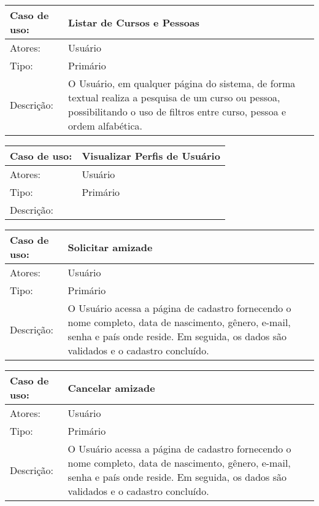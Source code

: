 \documentclass[12pt,a4paper,onecolumn,titlepage]{article}
\begin{document}
\newpage

\begin{table}[h!]
\begin{center}
\begin{tabular}{p{2.5cm} p{9.5cm}}
Caso de uso: & \textbf{Listar de Cursos e Pessoas} \\ \hline
Atores: & Usuário \\ \hline
Tipo: & Primário \\ \hline
Descrição: & O Usuário, em qualquer página do sistema, de forma textual realiza a pesquisa de um curso ou pessoa, possibilitando o uso de filtros entre curso, pessoa e ordem alfabética.

\end{tabular}
\end{center}
\end{table}

\newpage

\begin{table}[h!]
\begin{center}
\begin{tabular}{p{2.5cm} p{9.5cm}}
Caso de uso: & \textbf{Visualizar Perfis de Usuário} \\ \hline
Atores: & Usuário \\ \hline
Tipo: & Primário \\ \hline
Descrição: & 
\end{tabular}
\end{center}
\end{table}

\newpage

\begin{table}[h!]
\begin{center}
\begin{tabular}{p{2.5cm} p{9.5cm}}
Caso de uso: & \textbf{Solicitar amizade} \\ \hline
Atores: & Usuário \\ \hline
Tipo: & Primário \\ \hline
Descrição: & O Usuário acessa a página de cadastro fornecendo o nome completo, data de nascimento, gênero, e-mail, senha e país onde reside. Em seguida, os dados são validados e o cadastro concluído.
\end{tabular}
\end{center}
\end{table}

\newpage

\begin{table}[h!]
\begin{center}
\begin{tabular}{p{2.5cm} p{9.5cm}}
Caso de uso: & \textbf{Cancelar amizade} \\ \hline
Atores: & Usuário \\ \hline
Tipo: & Primário \\ \hline
Descrição: & O Usuário acessa a página de cadastro fornecendo o nome completo, data de nascimento, gênero, e-mail, senha e país onde reside. Em seguida, os dados são validados e o cadastro concluído.
\end{tabular}
\end{center}
\end{table}
\end{document}
